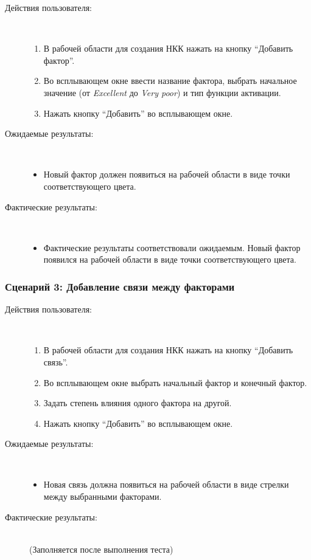 \documentclass{article}
\begin{document}
    \begin{description}
        \item [Действия пользователя:] \\
        \begin{enumerate}
            \item В рабочей области для создания НКК нажать на кнопку ``Добавить фактор''.
            \item Во всплывающем окне ввести название фактора, выбрать начальное значение (от \textit{Excellent} до \textit{Very poor}) и тип функции активации.
            \item Нажать кнопку ``Добавить'' во всплывающем окне.
        \end{enumerate}
        \item [Ожидаемые результаты:] \\
        \begin{itemize}
            \item Новый фактор должен появиться на рабочей области в виде точки соответствующего цвета.
        \end{itemize}
        \item [Фактические результаты:] \\
        \begin{itemize}
            \item Фактические результаты соответствовали ожидаемым. Новый фактор появился на рабочей области в виде точки соответствующего цвета.
        \end{itemize}
    \end{description}

    \subsubsection{Сценарий 3: Добавление связи между факторами}

    \begin{description}
        \item [Действия пользователя:] \\
        \begin{enumerate}
            \item В рабочей области для создания НКК нажать на кнопку ``Добавить связь''.
            \item Во всплывающем окне выбрать начальный фактор и конечный фактор.
            \item Задать степень влияния одного фактора на другой.
            \item Нажать кнопку ``Добавить'' во всплывающем окне.
        \end{enumerate}
        \item [Ожидаемые результаты:]\\
        \begin{itemize}
            \item Новая связь должна появиться на рабочей области в виде стрелки между выбранными факторами.
        \end{itemize}
        \item [Фактические результаты:]\\
        (Заполняется после выполнения теста)
    \end{description}
\end{document}
